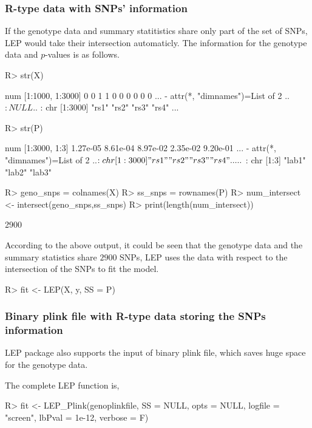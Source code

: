\documentclass[11pt]{article}
\begin{document}
\subsubsection{R-type data with SNPs' information}
If the genotype data and summary statitistics share only part of the set of SNPs, LEP would take their intersection automaticly. The information for the genotype data and $p$-values is as follows.
\begin{Schunk}
\begin{Sinput}
R> str(X)
\end{Sinput}
\begin{Soutput}
 num [1:1000, 1:3000] 0 0 1 1 0 0 0 0 0 0 ...
 - attr(*, "dimnames")=List of 2
  ..$ : NULL
  ..$ : chr [1:3000] "rs1" "rs2" "rs3" "rs4" ...
\end{Soutput}
\begin{Sinput}
R> str(P)
\end{Sinput}
\begin{Soutput}
 num [1:3000, 1:3] 1.27e-05 8.61e-04 8.97e-02 2.35e-02 9.20e-01 ...
 - attr(*, "dimnames")=List of 2
  ..$ : chr [1:3000] "rs1" "rs2" "rs3" "rs4" ...
  ..$ : chr [1:3] "lab1" "lab2" "lab3"
\end{Soutput}
\begin{Sinput}
R> geno_snps = colnames(X)
R> ss_snps = rownames(P)
R> num_intersect <- intersect(geno_snps,ss_snps)
R> print(length(num_intersect))
\end{Sinput}
\begin{Soutput}
[1] 2900
\end{Soutput}
\end{Schunk}
According to the above output, it could be seen that the genotype data and the summary statistics share $2900$ SNPs, LEP uses the data with respect to the intersection of the SNPs to fit the model.

\begin{Schunk}
\begin{Sinput}
R> fit <- LEP(X, y, SS = P)
\end{Sinput}
\end{Schunk}


\subsubsection{Binary plink file with R-type data storing the SNPs information}
LEP package also supports the input of binary plink file, which saves huge space for the genotype data.

The complete LEP function is,
\begin{Schunk}
\begin{Sinput}
R> fit <- LEP_Plink(genoplinkfile, SS = NULL, opts = NULL, logfile = "screen",
                                                    lbPval = 1e-12, verbose = F)
\end{Sinput}
\end{Schunk}
\end{document}
